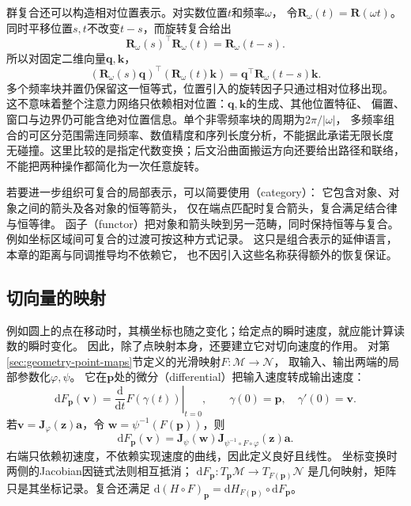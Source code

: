 群复合还可以构造相对位置表示。对实数位置$t$和频率$\omega$，
令$\bm R_\omega(t)=\bm R(\omega t)$。同时平移位置$s,t$不改变$t-s$，而旋转复合给出
\begin{equation}
 \bm R_\omega(s)^\top\bm R_\omega(t)=\bm R_\omega(t-s).
 \label{eq:geometry-rotary-relative-position}
\end{equation}
所以对固定二维向量$\bm q,\bm k$，
\begin{equation}
 (\bm R_\omega(s)\bm q)^\top(\bm R_\omega(t)\bm k)
 =\bm q^\top\bm R_\omega(t-s)\bm k.
 \label{eq:geometry-rotary-dot-product}
\end{equation}
多个频率块并置仍保留这一恒等式，位置引入的旋转因子只通过相对位移出现。
这不意味着整个注意力网络只依赖相对位置：$\bm q,\bm k$的生成、其他位置特征、
偏置、窗口与边界仍可能含绝对位置信息。单个非零频率块的周期为$2\pi/|\omega|$，
多频率组合的可区分范围需连同频率、数值精度和序列长度分析，不能据此承诺无限长度
无碰撞。这里比较的是指定代数变换；后文沿曲面搬运方向还要给出路径和联络，
不能把两种操作都简化为一次任意旋转。


若要进一步组织可复合的局部表示，可以简要使用（category）：
它包含对象、对象之间的箭头及各对象的恒等箭头，
仅在端点匹配时复合箭头，复合满足结合律与恒等律。
函子（functor）把对象和箭头映到另一范畴，同时保持恒等与复合。
例如坐标区域间可复合的过渡可按这种方式记录。
这只是组合表示的延伸语言，本章的距离与同调推导均不依赖它，
也不因引入这些名称获得额外的恢复保证。

\subsection{切向量的映射}
\label{sec:geometry-tangent-maps}

例如圆上的点在移动时，其横坐标也随之变化；给定点的瞬时速度，就应能计算读数的瞬时变化。
因此，除了点映射本身，还要建立它对切向速度的作用。
对第\ref{sec:geometry-point-maps}节定义的光滑映射$F:\mathcal M\to\mathcal N$，
取输入、输出两端的局部参数化$\varphi,\psi$。
它在$\bm p$处的微分（differential）把输入速度转成输出速度：
\[
 \mathrm dF_{\bm p}(\bm v)
 =\left.\frac{\mathrm d}{\mathrm dt}F(\gamma(t))\right|_{t=0},
 \qquad\gamma(0)=\bm p,\quad\gamma'(0)=\bm v.
\]
若$\bm v=\bm J_\varphi(\bm z)\bm a$，令
$\bm w=\psi^{-1}(F(\bm p))$，则
\begin{equation}
 \mathrm dF_{\bm p}(\bm v)
 =\bm J_\psi(\bm w)
   \bm J_{\psi^{-1}\circ F\circ\varphi}(\bm z)\bm a.
 \label{eq:geometry-map-differential}
\end{equation}
右端只依赖初速度，不依赖实现速度的曲线，因此定义良好且线性。
坐标变换时两侧的Jacobian因链式法则相互抵消；
$\mathrm dF_{\bm p}:T_{\bm p}\mathcal M\to T_{F(\bm p)}\mathcal N$
是几何映射，矩阵只是其坐标记录。复合还满足
$\mathrm d(H\circ F)_{\bm p}=\mathrm dH_{F(\bm p)}\circ\mathrm dF_{\bm p}$。

